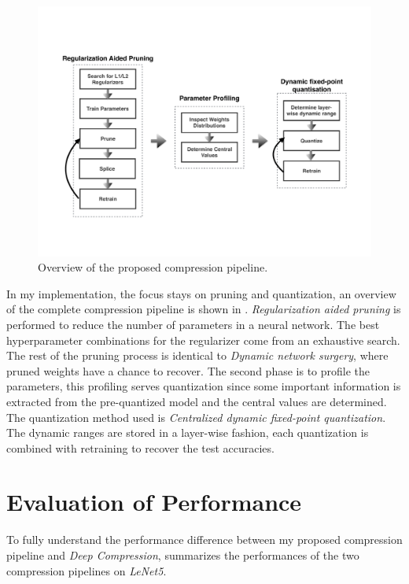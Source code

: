 \documentclass[a4paper,12pt]{report}
\begin{document}
\begin{figure}[!h]
  \includegraphics[width=\textwidth]{fig_proposed_flow.pdf}
  \caption{Overview of the proposed compression pipeline.}
  \label{fig:proposed_compression_flow}
\end{figure}

In my implementation, the focus stays on pruning and quantization, an overview
of the complete compression pipeline is shown in .
\textit{Regularization aided pruning} is performed to reduce the number of
parameters in a neural network.
The best hyperparameter combinations for the regularizer come from an exhaustive
search.
The rest of the pruning process is identical to \textit{Dynamic network surgery}, where
pruned weights have a chance to recover.
The second phase is to profile the parameters, this profiling serves quantization
since some important information is extracted from the pre-quantized model and
the central values are determined.
The quantization method used is \textit{Centralized dynamic fixed-point quantization}.
The dynamic ranges are stored in a layer-wise fashion, each quantization is
combined with retraining to recover the test accuracies.

\section{Evaluation of Performance}
To fully understand the performance difference between my proposed compression
pipeline and \textit{Deep Compression},  summarizes the
performances of the two compression pipelines on \textit{LeNet5}.
\end{document}
